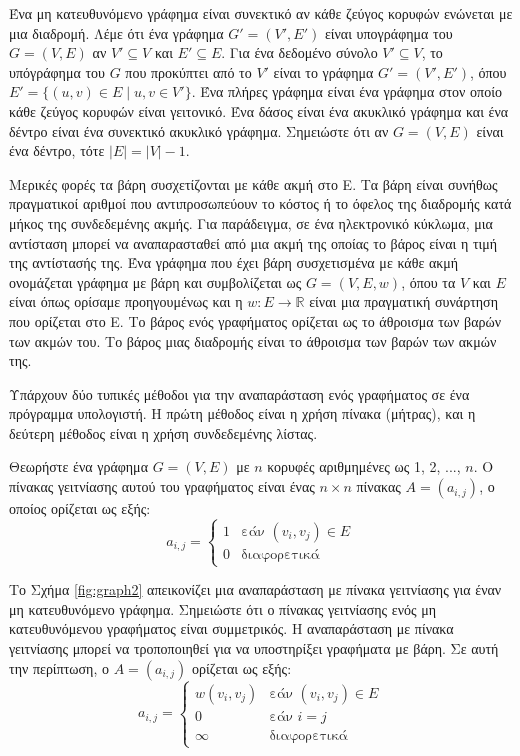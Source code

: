 \documentclass[12pt,a4paper]{article}
\begin{document}
Ένα μη κατευθυνόμενο γράφημα είναι συνεκτικό αν κάθε ζεύγος κορυφών ενώνεται με μια διαδρομή. Λέμε ότι ένα γράφημα $G' = (V', E')$ είναι υπογράφημα του $G = (V, E)$ αν $V'\subseteq V$ και $E'\subseteq E$. Για ένα δεδομένο σύνολο $V'\subseteq V$, το υπόγράφημα του $G$ που προκύπτει από το $V'$ είναι το γράφημα $G' = (V', E')$, όπου $E' = \{ (u, v) \in E \mid u, v \in V' \}$. Ένα πλήρες γράφημα είναι ένα γράφημα στον οποίο κάθε ζεύγος κορυφών είναι γειτονικό. Ένα δάσος είναι ένα ακυκλικό γράφημα και ένα δέντρο είναι ένα συνεκτικό ακυκλικό γράφημα. Σημειώστε ότι αν $G = (V, E)$ είναι ένα δέντρο, τότε $|E| = |V| - 1$.

Μερικές φορές τα βάρη συσχετίζονται με κάθε ακμή στο Ε. Τα βάρη είναι συνήθως πραγματικοί αριθμοί που αντιπροσωπεύουν το κόστος ή το όφελος της διαδρομής κατά μήκος της συνδεδεμένης ακμής. Για παράδειγμα, σε ένα ηλεκτρονικό κύκλωμα, μια αντίσταση μπορεί να αναπαρασταθεί από μια ακμή της οποίας το βάρος είναι η τιμή της  αντίστασής της. Ένα γράφημα που έχει βάρη συσχετισμένα με κάθε ακμή ονομάζεται γράφημα με βάρη και συμβολίζεται ως $G = (V, E, w)$, όπου τα $V$ και $E$ είναι όπως ορίσαμε προηγουμένως και η $w : E \to \mathbb{R}$ είναι μια πραγματική συνάρτηση που ορίζεται στο E. Το βάρος ενός γραφήματος ορίζεται ως το άθροισμα των βαρών των ακμών του. Το βάρος μιας διαδρομής είναι το άθροισμα των βαρών των ακμών της.

Υπάρχουν δύο τυπικές μέθοδοι για την αναπαράσταση ενός γραφήματος σε ένα πρόγραμμα υπολογιστή. Η πρώτη μέθοδος είναι η χρήση πίνακα (μήτρας), και η δεύτερη μέθοδος είναι η χρήση συνδεδεμένης λίστας.

Θεωρήστε ένα γράφημα $G = (V, E)$ με $n$ κορυφές αριθμημένες ως 1, 2, ..., $n$. Ο πίνακας γειτνίασης αυτού του γραφήματος είναι ένας $n \times n$ πίνακας $A = (a_{i,j})$, ο οποίος ορίζεται ως εξής: \[
a_{i,j} =
\begin{cases}
1 & \text{εάν } (v_i, v_j) \in E\\[2mm]
0 & \text{διαφορετικά}
\end{cases}
\]

Το Σχήμα \ref{fig:graph2} απεικονίζει μια αναπαράσταση με πίνακα γειτνίασης για έναν μη κατευθυνόμενο γράφημα. Σημειώστε ότι ο πίνακας γειτνίασης ενός μη κατευθυνόμενου γραφήματος είναι συμμετρικός. Η αναπαράσταση με πίνακα γειτνίασης μπορεί να τροποποιηθεί για να υποστηρίξει γραφήματα με βάρη. Σε αυτή την περίπτωση, ο $A = (a_{i,j})$ ορίζεται ως εξής:
\[
a_{i,j} =
\begin{cases}
w(v_i, v_j) & \text{εάν } (v_i, v_j) \in E\\[2mm]
0 & \text{εάν } i = j\\[2mm]
\infty & \text{διαφορετικά}
\end{cases}
\]
\end{document}

